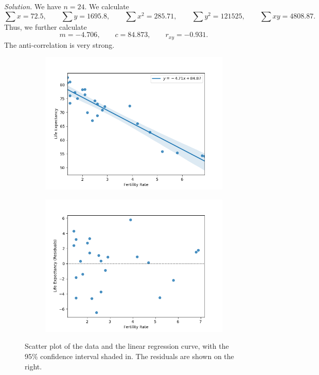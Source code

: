 \documentclass[10pt]{article}
\begin{document}
        \textit{Solution.} 
        We have $n = 24$. We calculate 
        \[
                \sum x = 72.5, \qquad \sum y = 1695.8, \qquad \sum x^2 = 285.71, \qquad \sum y^2 = 121525, \qquad \sum xy = 4808.87.
        \]
        Thus, we further calculate
        \[
                m = -4.706, \qquad c = 84.873, \qquad r_{xy} = -0.931.
        \]
        The anti-correlation is very strong.
        \begin{figure}[H]
        \centering
        \begin{subfigure}[b]{0.49\textwidth}
                \includegraphics[width=\textwidth]{./10_3_1.png}
        \end{subfigure}
        \begin{subfigure}[b]{0.49\textwidth}
                \includegraphics[width=\textwidth]{./10_3_2.png}
        \end{subfigure}
        \caption{Scatter plot of the data and the linear regression curve, with the 95\% confidence interval shaded in.
        The residuals are shown on the right.}
        \label{fig:expectancy}
        \end{figure}
\end{document}
